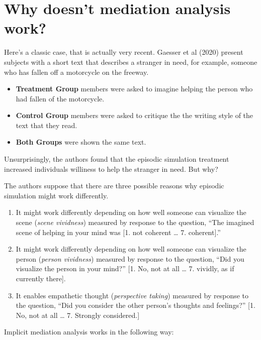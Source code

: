\documentclass[
]{book}
\providecommand{\tightlist}{%
  \setlength{\itemsep}{0pt}\setlength{\parskip}{0pt}}
\begin{document}
\hypertarget{why-doesnt-mediation-analysis-work}{%
\section{Why doesn't mediation analysis
work?}\label{why-doesnt-mediation-analysis-work}}

Here's a classic case, that is actually very recent. Gaesser et al
(2020) present subjects with a short text that describes a stranger in
need, for example, someone who has fallen off a motorcycle on the
freeway.

\begin{itemize}
\tightlist
\item
  \textbf{Treatment Group} members were asked to imagine helping the
  person who had fallen of the motorcycle.
\item
  \textbf{Control Group} members were asked to critique the the writing
  style of the text that they read.
\item
  \textbf{Both Groups} were shown the same text.
\end{itemize}

Unsurprisingly, the authors found that the episodic simulation treatment
increased individuals williness to help the stranger in need. But why?

The authors suppose that there are three possible reasons why episodic
simulation might work differently.

\begin{enumerate}
\def\labelenumi{\arabic{enumi}.}
\tightlist
\item
  It might work differently depending on how well someone can visualize
  the scene (\emph{scene vividness}) measured by response to the
  question, ``The imagined scene of helping in your mind was {[}1. not
  coherent \ldots{} 7. coherent{]}.''
\item
  It might work differently depending on how well someone can visualize
  the person (\emph{person vividness}) measured by response to the
  question, ``Did you visualize the person in your mind?'' {[}1. No, not
  at all \ldots{} 7. vividly, as if currently there{]}.
\item
  It enables empathetic thought (\emph{perspective taking}) measured by
  response to the question, ``Did you consider the other person's
  thoughts and feelings?'' {[}1. No, not at all \ldots{} 7. Strongly
  considered.{]}
\end{enumerate}

Implicit mediation analysis works in the following way:
\end{document}

